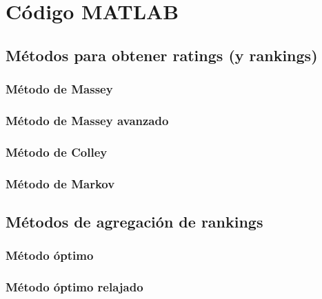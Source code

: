 \chapter{Código MATLAB}

\section{Métodos para obtener ratings (y rankings)}

\subsection*{Método de Massey}



\subsection*{Método de Massey avanzado}

\subsection*{Método de Colley}



\subsection*{Método de Markov}



\section{Métodos de agregación de rankings}

\subsection*{Método óptimo}



\subsection*{Método óptimo relajado}

